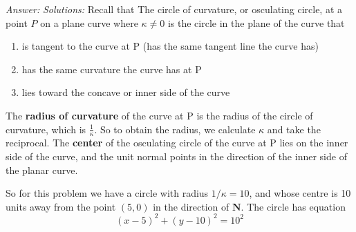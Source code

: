 \ifnum {} {\color{DarkBlue} \textit{Answer:} \textit{Solutions:} Recall that The circle of curvature, or osculating circle, at a point $P$ on a plane curve where $\kappa \ne 0$ is the circle in the plane of the curve that

\begin{enumerate}
    \item is tangent to the curve at P (has the same tangent line the curve has)
    \item has the same curvature the curve has at P
    \item lies toward the concave or inner side of the curve
\end{enumerate}
The \textbf{radius of curvature} of the curve at P is the radius of the circle of curvature, which is $\frac{1}{\kappa}$. So to obtain the radius, we calculate $\kappa$ and take the reciprocal. The \textbf{center} of the osculating circle of the curve at P lies on the inner side of the curve, and the unit normal points in the direction of the inner side of the planar curve. 

So for this problem we have a circle with radius $1/\kappa = 10$, and whose centre is 10 units away from the point $(5,0)$ in the direction of $\mathbf N$. The circle has equation
$$(x-5)^2 + (y-10)^2 = 10^2$$
} 
\else
  
\fi        
\fi
